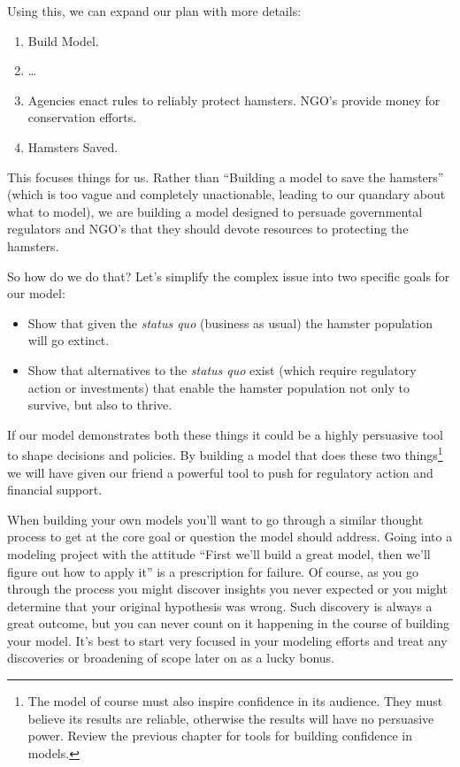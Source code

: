 \documentclass[]{memoir}
\begin{document}
Using this, we can expand our plan with more details:

\begin{enumerate}
\def\labelenumi{\arabic{enumi}.}
\itemsep1pt\parskip0pt
\item
  Build Model.
\item
  \ldots{}
\item
  Agencies enact rules to reliably protect hamsters. NGO's provide money
  for conservation efforts.
\item
  Hamsters Saved.
\end{enumerate}

This focuses things for us. Rather than ``Building a model to save the
hamsters'' (which is too vague and completely unactionable, leading to
our quandary about what to model), we are building a model designed to
persuade governmental regulators and NGO's that they should devote
resources to protecting the hamsters.

So how do we do that? Let's simplify the complex issue into two specific
goals for our model:

\begin{itemize}
\itemsep1pt\parskip0pt
\item
  Show that given the \emph{status quo} (business as usual) the hamster
  population will go extinct.
\item
  Show that alternatives to the \emph{status quo} exist (which require
  regulatory action or investments) that enable the hamster population
  not only to survive, but also to thrive.
\end{itemize}

If our model demonstrates both these things it could be a highly
persuasive tool to shape decisions and policies. By building a model
that does these two things\footnote{The model of course must also
  inspire confidence in its audience. They must believe its results are
  reliable, otherwise the results will have no persuasive power. Review
  the previous chapter for tools for building confidence in models.} we
will have given our friend a powerful tool to push for regulatory action
and financial support.

When building your own models you'll want to go through a similar
thought process to get at the core goal or question the model should
address. Going into a modeling project with the attitude ``First we'll
build a great model, then we'll figure out how to apply it'' is a
prescription for failure. Of course, as you go through the process you
might discover insights you never expected or you might determine that
your original hypothesis was wrong. Such discovery is always a great
outcome, but you can never count on it happening in the course of
building your model. It's best to start very focused in your modeling
efforts and treat any discoveries or broadening of scope later on as a
lucky bonus.
\end{document}
